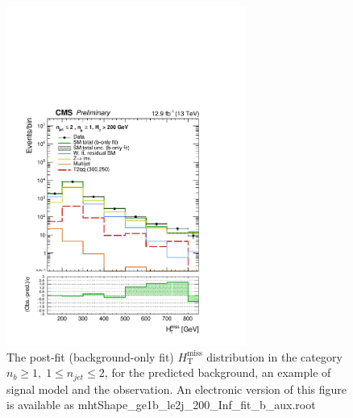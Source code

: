 \begin{figure}[tbhp]
    \caption{ 
    The post-fit (background-only fit) $H_{\mathrm{T}}^{\mathrm{miss}}$ distribution in the category $n_{b}\geq 1, \; 1 \leq n_{jet} \leq 2$, 
    for the predicted background, an example of signal model and the observation.
    An electronic version of this figure is available as mhtShape\_ge1b\_le2j\_200\_Inf\_fit\_b\_aux.root
    \label{fig:mhtShape_ge1b_le2j_fit_b} }
  \begin{center}
  \includegraphics[width=0.7\textwidth]{mhtShape_ge1b_le2j_200_Inf_fit_b_aux}
  \end{center}
\end{figure}


